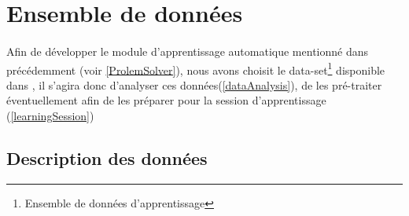 
\section{Ensemble de données}
\paragraph{}
Afin de développer le module d'apprentissage automatique mentionné dans précédemment (voir \ref{ProlemSolver}), nous avons choisit le data-set\footnote{Ensemble de données d'apprentissage} disponible dans \cite{dataset}, il s'agira donc d'analyser ces données(\ref{dataAnalysis}), de les pré-traiter éventuellement afin de les préparer pour la session d'apprentissage (\ref{learningSession})
\subsection{Description des données}
